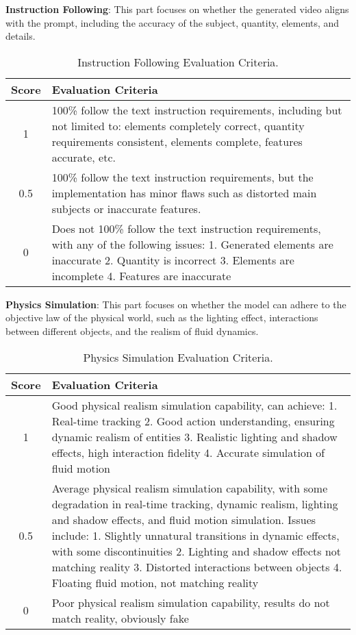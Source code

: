 \textbf{Instruction Following}: This part focuses on whether the generated video aligns with the prompt, including the accuracy of the subject, quantity, elements, and details.

\begin{table}[h]
\centering
\caption{Instruction Following Evaluation Criteria.}
\label{sample-table}
\small

\begin{tabular}{cp{11cm}}
\toprule

\textbf{Score} & \textbf{Evaluation Criteria} \\
\midrule
1  & 100\% follow the text instruction requirements, including but not limited to: elements completely correct, quantity requirements consistent, elements complete, features accurate, etc. \\
\midrule
0.5  & 100\% follow the text instruction requirements, but the implementation has minor flaws such as distorted main subjects or inaccurate features. \\
\midrule
0  & Does not 100\% follow the text instruction requirements, with any of the following issues:  1. Generated elements are inaccurate  2. Quantity is incorrect  3. Elements are incomplete  4. Features are inaccurate \\
\bottomrule
\end{tabular}
\end{table}



\textbf{Physics Simulation}: This part focuses on whether the model can adhere to the objective law of the physical world, such as the lighting effect, interactions between different objects, and the realism of fluid dynamics. 


\begin{table}[h]
\centering
\caption{Physics Simulation Evaluation Criteria.}
\label{sample-table}
\small

\begin{tabular}{cp{11cm}}
\toprule

\textbf{Score} & \textbf{Evaluation Criteria} \\
\midrule
1  & Good physical realism simulation capability, can achieve: 1. Real-time tracking 2. Good action understanding, ensuring dynamic realism of entities 3. Realistic lighting and shadow effects, high interaction fidelity 4. Accurate simulation of fluid motion \\
\midrule
0.5  & Average physical realism simulation capability, with some degradation in real-time tracking, dynamic realism, lighting and shadow effects, and fluid motion simulation. Issues include: 1. Slightly unnatural transitions in dynamic effects, with some discontinuities 2. Lighting and shadow effects not matching reality 3. Distorted interactions between objects 4. Floating fluid motion, not matching reality \\
\midrule
0  & Poor physical realism simulation capability, results do not match reality, obviously fake \\

\bottomrule
\end{tabular}
\end{table}



